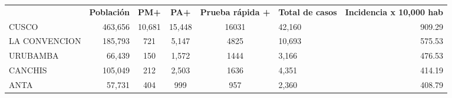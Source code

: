 	\begin{tabular}{lrccclr}
		\rowcolor[HTML]{DCE6F1} 
		\multicolumn{1}{c}{\cellcolor[HTML]{DCE6F1}\textbf{PROVINCIA}} & \multicolumn{1}{c}{\cellcolor[HTML]{DCE6F1}\textbf{Población}} & \textbf{PM+}                                                & \textbf{PA+}         & \textbf{Prueba rápida +} & \multicolumn{1}{c}{\cellcolor[HTML]{DCE6F1}\textbf{Total de casos}} & \multicolumn{1}{c}{\cellcolor[HTML]{DCE6F1}\textbf{Incidencia x 10,000 hab}} \\
		\cellcolor[HTML]{FF5050}CUSCO                                  & 463,656                                                        & 10,681                                                      & 15,448               & 16031                    & 42,160                                                              & 909.29                                                                       \\
		\cellcolor[HTML]{F4B084}LA   CONVENCION                        & 185,793                                                        & 721                                                         & 5,147                & 4825                     & 10,693                                                              & 575.53                                                                       \\
		\cellcolor[HTML]{F4B084}URUBAMBA                               & 66,439                                                         & 150                                                         & 1,572                & 1444                     & 3,166                                                               & 476.53                                                                       \\
		\cellcolor[HTML]{FFE699}CANCHIS                                & 105,049                                                        & 212                                                         & 2,503                & 1636                     & 4,351                                                               & 414.19                                                                       \\
		\cellcolor[HTML]{FFE699}ANTA                                   & 57,731                                                         & 404                                                         & 999                  & 957                      & 2,360                                                               & 408.79                                                                       \\

\end{tabular}
